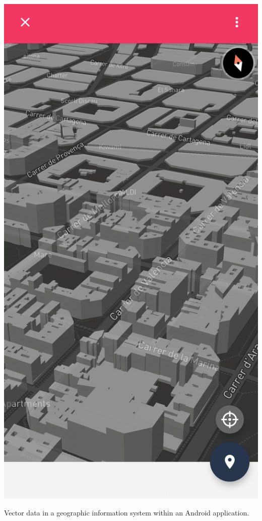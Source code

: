\begin{marginfigure}[-6.8cm]
	\includegraphics{figs/fundamentals/raster_gis.png}
	\caption{Vector data in a geographic information system within an Android application.}
	\label{fig:raster_gis}
\end{marginfigure}

